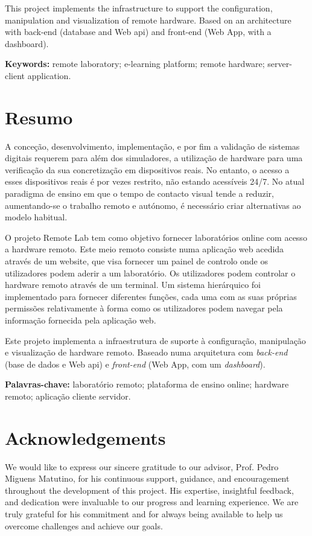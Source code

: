 \documentclass[a4paper,openright,twoside,11pt]{report}
\begin{document}
This project implements the infrastructure to support the configuration, manipulation and visualization
of remote hardware. Based on an architecture with back-end (database and Web \acs{api}) and front-end (Web App, with a dashboard). 

\vspace{2mm}

\textbf{Keywords:} remote laboratory; e-learning platform; remote hardware; server-client application.

\chapter*{Resumo}
A conceção, desenvolvimento, implementação, e por fim a validação de sistemas digitais 
requerem para além dos simuladores, a utilização de hardware para uma verificação da sua 
concretização em dispositivos reais. No entanto, o acesso a esses dispositivos reais é por 
vezes restrito, não estando acessíveis 24/7. No atual paradigma de ensino em que o tempo de contacto visual tende a reduzir, aumentando-se o trabalho remoto e autónomo, é necessário criar alternativas 
ao modelo habitual. 

O projeto Remote Lab tem como objetivo fornecer laboratórios online com acesso a hardware remoto.
Este meio remoto consiste numa aplicação web acedida 
através de um website, que visa fornecer um painel de controlo onde os utilizadores podem aderir a um laboratório. 
Os utilizadores podem controlar o hardware remoto através de um terminal. Um sistema hierárquico foi implementado para 
fornecer diferentes funções, cada uma com as suas próprias permissões relativamente à forma como os utilizadores 
podem navegar pela informação fornecida pela aplicação web.

Este projeto implementa a infraestrutura de suporte à configuração, manipulação e visualização de hardware remoto. 
Baseado numa arquitetura com \textit{back-end} (base de dados e Web \acs{api}) e \textit{front-end} (Web App, com um \textit{dashboard}).

\vspace{2mm}

\textbf{Palavras-chave:} laboratório remoto; plataforma de ensino online; hardware remoto; aplicação cliente servidor.


\cleardoublepage
\chapter*{Acknowledgements}
We would like to express our sincere gratitude to our advisor, Prof. Pedro Miguens Matutino, for his continuous support, guidance, and encouragement throughout the development of this project. His expertise, insightful feedback, and dedication were invaluable to our progress and learning experience. We are truly grateful for his commitment and for always being available to help us overcome challenges and achieve our goals.\\
\end{document}
